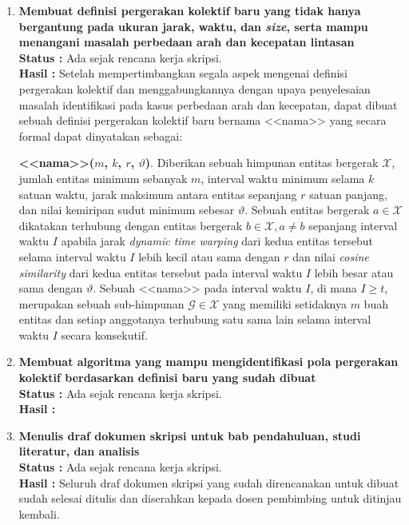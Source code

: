 \documentclass[a4paper,twoside]{article}
\begin{document}
\begin{enumerate}
		\item \textbf{Membuat definisi pergerakan kolektif baru yang tidak hanya bergantung pada ukuran jarak, waktu, dan \textit{size}, serta mampu menangani masalah perbedaan arah dan kecepatan lintasan}\\
		{\bf Status :} Ada sejak rencana kerja skripsi.\\
		{\bf Hasil :} Setelah mempertimbangkan segala aspek mengenai definisi pergerakan kolektif dan menggabungkannya dengan upaya penyelesaian masalah identifikasi pada kasus perbedaan arah dan kecepatan, dapat dibuat sebuah definisi pergerakan kolektif baru bernama <<nama>> yang secara formal dapat dinyatakan sebagai:
		
		\noindent \textbf{<<nama>>($m$, $k$, $r$, $\vartheta$)}. Diberikan sebuah himpunan entitas bergerak $\mathcal{X}$, jumlah entitas minimum sebanyak $m$, interval waktu minimum selama $k$ satuan waktu, jarak maksimum antara entitas sepanjang $r$ satuan panjang, dan nilai kemiripan sudut minimum sebesar $\vartheta$. Sebuah entitas bergerak $a \in \mathcal{X}$ dikatakan terhubung dengan entitas bergerak $b \in \mathcal{X}, a \neq b$ sepanjang interval waktu $I$ apabila jarak \textit{dynamic time warping} dari kedua entitas tersebut selama interval waktu $I$ lebih kecil atau sama dengan $r$ dan nilai \textit{cosine similarity} dari kedua entitas tersebut pada interval waktu $I$ lebih besar atau sama dengan $\vartheta$. Sebuah <<nama>> pada interval waktu $I$, di mana $I \geq t$, merupakan sebuah sub-himpunan $\mathcal{G} \in \mathcal{X}$ yang memiliki setidaknya $m$ buah entitas dan setiap anggotanya terhubung satu sama lain selama interval waktu $I$ secara konsekutif. \\

		\item \textbf{Membuat algoritma yang mampu mengidentifikasi pola pergerakan kolektif berdasarkan definisi baru yang sudah dibuat}\\
		{\bf Status :} Ada sejak rencana kerja skripsi.\\
		{\bf Hasil :}

		\item \textbf{Menulis draf dokumen skripsi untuk bab pendahuluan, studi literatur, dan analisis}\\
		{\bf Status :} Ada sejak rencana kerja skripsi.\\
		{\bf Hasil :} Seluruh draf dokumen skripsi yang sudah direncanakan untuk dibuat sudah selesai ditulis dan diserahkan kepada dosen pembimbing untuk ditinjau kembali.


\end{enumerate}
\end{document}
